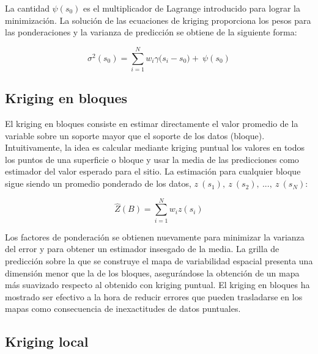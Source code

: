 \documentclass[11pt,b5paper,]{krantz}
\begin{document}
La cantidad \(\psi (s_0)\) es el multiplicador de Lagrange introducido para lograr la minimización. La solución de las ecuaciones de kriging proporciona los pesos para las ponderaciones y la varianza de predicción se obtiene de la siguiente forma:

\[\sigma^2(s_0)=\sum_{i=1}^{N}{w_i\gamma(}s_i-s_0)+\ \psi(s_0)\]

\hypertarget{kriging-en-bloques}{%
\subsection{Kriging en bloques}\label{kriging-en-bloques}}

El kriging en bloques consiste en estimar directamente el valor promedio de la variable sobre un soporte mayor que el soporte de los datos (bloque). Intuitivamente, la idea es calcular mediante kriging puntual los valores en todos los puntos de una superficie o bloque y usar la media de las predicciones como estimador del valor esperado para el sitio. La estimación para cualquier bloque sigue siendo un promedio ponderado de los datos, \(z\ (s_1),\ z\ (s_2),\ ...,\ z\ (s_N)\):

\[\hat{Z}(B)=\sum_{i=1}^{N}{w_iz(s_i)}\]

Los factores de ponderación se obtienen nuevamente para minimizar la varianza del error y para obtener un estimador insesgado de la media. La grilla de predicción sobre la que se construye el mapa de variabilidad espacial presenta una dimensión menor que la de los bloques, asegurándose la obtención de un mapa más suavizado respecto al obtenido con kriging puntual. El kriging en bloques ha mostrado ser efectivo a la hora de reducir errores que pueden trasladarse en los mapas como consecuencia de inexactitudes de datos puntuales.

\hypertarget{kriging-local}{%
\subsection{Kriging local}\label{kriging-local}}
\end{document}
